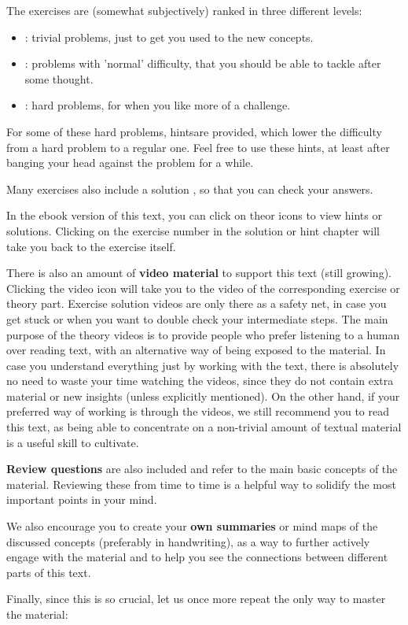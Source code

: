 The exercises are (somewhat subjectively) ranked in three different levels:

\begin{itemize}
\item \iconoffset\trivial : trivial problems, just to get you used to the new concepts.
\item \iconoffset\normal : problems with 'normal' difficulty, that you should be able to tackle after some thought.
\item \iconoffset\hard : hard problems, for when you like more of a challenge.
\end{itemize}

For some of these hard problems, hints\iconoffset\hint are provided, which lower the difficulty from a hard problem to a regular one. Feel free to use these hints, at least after banging your head against the problem for a while.

Many exercises also include a solution \iconoffset\solution, so that you can check your answers.

In the ebook version of this text, you can click on the\iconoffset\hint or \iconoffset\solution icons to view hints or solutions. Clicking on the exercise number in the solution or hint chapter will take you back to the exercise itself.

There is also an amount of \textbf{video material} to support this text (still growing). Clicking the video icon \iconoffset\youtube will take you to the video of the corresponding exercise or theory part. Exercise solution videos are only there as a safety net, in case you get stuck or when you want to double check your intermediate steps. The main purpose of the theory videos is to provide people who prefer listening to a human over reading text, with an alternative way of being exposed to the material. In case you understand everything just by working with the text, there is absolutely no need to waste your time watching the videos, since they do not contain extra material or new insights (unless explicitly mentioned). On the other hand, if your preferred way of working is through the videos, we still recommend you to read this text, as being able to concentrate on a non-trivial amount of textual material is a useful skill to cultivate.

\textbf{Review questions} are also included and refer to the main basic concepts of the material. Reviewing these from time to time is a helpful way to solidify the most important points in your mind.

We also encourage you to create your \textbf{own summaries} or mind maps of the discussed concepts (preferably in handwriting), as a way to further actively engage with the material and to help you see the connections between different parts of this text.

Finally, since this is so crucial, let us once more repeat the only way to master the material:
\\



